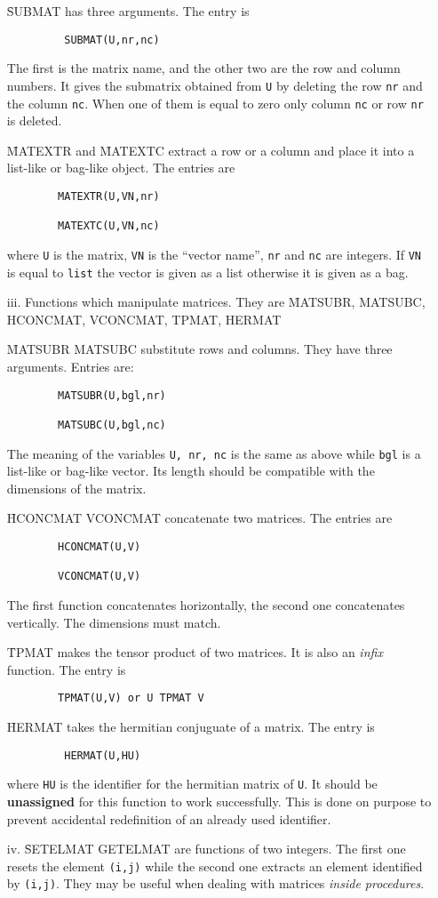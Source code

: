 \begin{itemize}
\f{SUBMAT} has three arguments. The entry is
\begin{verbatim}
         SUBMAT(U,nr,nc)
\end{verbatim}
The first is the matrix name, and the other two are the row  and column
numbers.  It gives the
submatrix obtained from \verb+U+ by deleting the row \verb+nr+ and
the column \verb+nc+.
When one of them is equal to zero only column \verb+nc+
or row \verb+nr+ is deleted.

\f{MATEXTR} and \f{MATEXTC} extract a row or a column and place it into
a list-like or bag-like object.
The entries are
\begin{verbatim}
        MATEXTR(U,VN,nr)

        MATEXTC(U,VN,nc)
\end{verbatim}
where \verb+U+ is the matrix,  \verb+VN+ is the ``vector name'',
\verb+nr+  and \verb+nc+ are integers.  If \verb+VN+  is equal
to {\tt list} the vector  is given  as a list otherwise  it is
given as a bag.
\item[iii.]
Functions which manipulate matrices. They are
\f{MATSUBR, MATSUBC, HCONCMAT, VCONCMAT, TPMAT, HERMAT}

\f{MATSUBR MATSUBC} substitute rows and columns. They have three arguments.
Entries are:
\begin{verbatim}
        MATSUBR(U,bgl,nr)

        MATSUBC(U,bgl,nc)
\end{verbatim}
The meaning of the variables \verb+U, nr, nc+ is the same as above
while \verb+bgl+ is a list-like or bag-like vector.
Its length should be compatible with the dimensions of the matrix.

\f{HCONCMAT VCONCMAT} concatenate two matrices. The entries are
\begin{verbatim}
        HCONCMAT(U,V)

        VCONCMAT(U,V)
\end{verbatim}
The first function concatenates horizontally, the second one
concatenates vertically. The dimensions must match.

\f{TPMAT} makes the tensor product of two matrices. It is also an
{\em infix} function. The entry is
\begin{verbatim}
        TPMAT(U,V) or U TPMAT V
\end{verbatim}
\f{HERMAT} takes the hermitian conjuguate of a matrix.
The entry is
\begin{verbatim}
         HERMAT(U,HU)
\end{verbatim}
where \verb+HU+ is the identifier for the hermitian matrix of \verb+U+.
It should be {\bf unassigned} for this function to work  successfully.
This is done on  purpose to prevent accidental redefinition of an already
used identifier.
\item[iv.]
\f{SETELMAT GETELMAT} are functions of two integers. The first one
resets the element \verb+(i,j)+ while the second one extracts an
element identified by \verb+(i,j)+. They may be useful when
dealing with matrices {\em inside procedures}.
\end{itemize}
